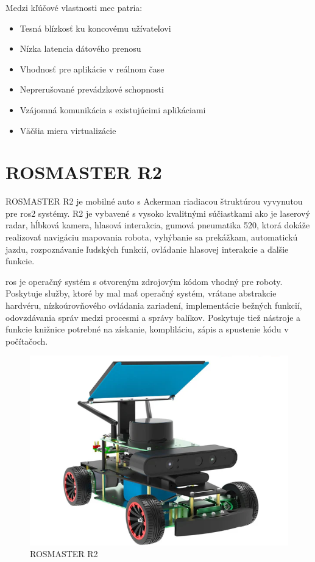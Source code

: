 Medzi kľúčové vlastnosti \acrshort{mec} patria:

\begin{itemize}

    \item Tesná blízkosť ku koncovému užívateľovi
    \item Nízka latencia dátového prenosu
    \item Vhodnosť pre aplikácie v reálnom čase
    \item Neprerušované prevádzkové schopnosti
    \item Vzájomná komunikácia s existujúcimi aplikáciami
    \item Väčšia miera virtualizácie \cite{mec}

\end{itemize}

\section{ROSMASTER R2}

ROSMASTER R2 je mobilné auto s Ackerman riadiacou štruktúrou vyvynutou pre \acrshort{ros}2 systémy. R2 je vybavené s vysoko kvalitnými súčiastkami ako je laserový radar, hĺbková kamera, hlasová interakcia, gumová pneumatika 520, ktorá dokáže realizovať navigáciu mapovania robota, vyhýbanie sa prekážkam, automatickú jazdu, rozpoznávanie ľudských funkcií, ovládanie hlasovej interakcie a ďalšie funkcie. \cite{ros}

\acrshort{ros} je operačný systém s otvoreným zdrojovým kódom vhodný pre roboty.
Poskytuje služby, ktoré by mal mať operačný systém, vrátane abstrakcie hardvéru, nízkoúrovňového ovládania zariadení, implementácie bežných funkcií, odovzdávania správ medzi procesmi a správy balíkov.
Poskytuje tiež nástroje a funkcie knižnice potrebné na získanie, kompliláciu, zápis a spustenie kódu v počítačoch.\cite{ros}

\begin{figure}[H]
    \centering
    \includegraphics[width=1\linewidth]{figures/R2.png}
    \caption{ROSMASTER R2 \label{r2}}
    \label{fig:enter-label}
\end{figure}

